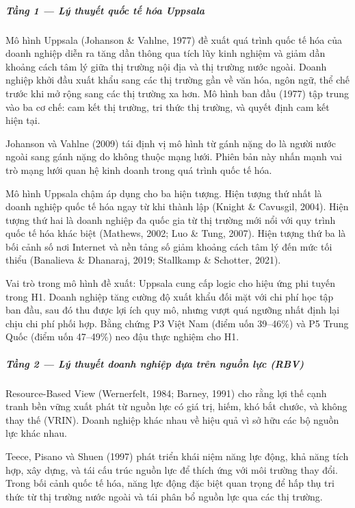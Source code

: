 \documentclass[12pt,a4paper]{article}
\begin{document}
\hypertarget{tux1ea7ng-1--luxfd-thuyux1ebft-quux1ed1c-tux1ebf-huxf3a-uppsala}{%
\subparagraph{Tầng 1 --- Lý thuyết quốc tế hóa
Uppsala}\label{tux1ea7ng-1--luxfd-thuyux1ebft-quux1ed1c-tux1ebf-huxf3a-uppsala}}

Mô hình Uppsala (Johanson \& Vahlne, 1977) đề xuất quá trình quốc tế hóa
của doanh nghiệp diễn ra tăng dần thông qua tích lũy kinh nghiệm và giảm
dần khoảng cách tâm lý giữa thị trường nội địa và thị trường nước ngoài.
Doanh nghiệp khởi đầu xuất khẩu sang các thị trường gần về văn hóa, ngôn
ngữ, thể chế trước khi mở rộng sang các thị trường xa hơn. Mô hình ban
đầu (1977) tập trung vào ba cơ chế: cam kết thị trường, tri thức thị
trường, và quyết định cam kết hiện tại.

Johanson và Vahlne (2009) tái định vị mô hình từ gánh nặng do là người
nước ngoài sang gánh nặng do không thuộc mạng lưới. Phiên bản này nhấn
mạnh vai trò mạng lưới quan hệ kinh doanh trong quá trình quốc tế hóa.

Mô hình Uppsala chậm áp dụng cho ba hiện tượng. Hiện tượng thứ nhất là
doanh nghiệp quốc tế hóa ngay từ khi thành lập (Knight \& Cavusgil,
2004). Hiện tượng thứ hai là doanh nghiệp đa quốc gia từ thị trường mới
nổi với quy trình quốc tế hóa khác biệt (Mathews, 2002; Luo \& Tung,
2007). Hiện tượng thứ ba là bối cảnh số nơi Internet và nền tảng số giảm
khoảng cách tâm lý đến mức tối thiểu (Banalieva \& Dhanaraj, 2019;
Stallkamp \& Schotter, 2021).

Vai trò trong mô hình đề xuất: Uppsala cung cấp logic cho hiệu ứng phi
tuyến trong H1. Doanh nghiệp tăng cường độ xuất khẩu đối mặt với chi phí
học tập ban đầu, sau đó thu được lợi ích quy mô, nhưng vượt quá ngưỡng
nhất định lại chịu chi phí phối hợp. Bằng chứng P3 Việt Nam (điểm uốn
39--46\%) và P5 Trung Quốc (điểm uốn 47--49\%) neo đậu thực nghiệm cho
H1.

\hypertarget{tux1ea7ng-2--luxfd-thuyux1ebft-doanh-nghiux1ec7p-dux1ef1a-truxean-nguux1ed3n-lux1ef1c-rbv}{%
\subparagraph{Tầng 2 --- Lý thuyết doanh nghiệp dựa trên nguồn lực
(RBV)}\label{tux1ea7ng-2--luxfd-thuyux1ebft-doanh-nghiux1ec7p-dux1ef1a-truxean-nguux1ed3n-lux1ef1c-rbv}}

Resource-Based View (Wernerfelt, 1984; Barney, 1991) cho rằng lợi thế
cạnh tranh bền vững xuất phát từ nguồn lực có giá trị, hiếm, khó bắt
chước, và không thay thế (VRIN). Doanh nghiệp khác nhau về hiệu quả vì
sở hữu các bộ nguồn lực khác nhau.

Teece, Pisano và Shuen (1997) phát triển khái niệm năng lực động, khả
năng tích hợp, xây dựng, và tái cấu trúc nguồn lực để thích ứng với môi
trường thay đổi. Trong bối cảnh quốc tế hóa, năng lực động đặc biệt quan
trọng để hấp thụ tri thức từ thị trường nước ngoài và tái phân bổ nguồn
lực qua các thị trường.
\end{document}
